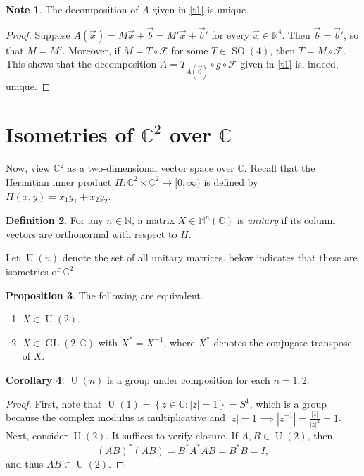 \documentclass[10pt,letterpaper,cm]{nupset}
\theoremstyle{definition}
\newtheorem{definition}{Definition}[section]
\newtheorem{note}[definition]{Note}
\theoremstyle{theorem}
\newtheorem{cor}[definition]{Corollary}
\newtheorem{prop}[definition]{Proposition}
\theoremstyle{remark}
\newcommand{\C}{\mathbb C}
\newcommand{\F}{\mathcal F}
\newcommand{\M}{\mathbb M}
\newcommand{\N}{\mathbb N}
\newcommand{\R}{\mathbb R}
\newcommand{\1}{\mathbf{1}}
\renewcommand{\b}{\vec b}
\newcommand{\x}{\vec x}
\newcommand{\0}{\vec {0}}
\DeclareMathOperator{\SO}{SO}
\DeclareMathOperator{\GL}{GL}
\DeclareMathOperator{\U}{U}
\begin{document}
\begin{note}\label{unique}
The  decomposition of $A$ given in \cref{t1} is unique. 
\end{note}

\begin{proof}
Suppose $A(\x)=M\x +\b =M'\x+\b'$ for every $\x\in \R^4$. Then $\b =\b'$, so that $M=M'$.  Moreover, if $M=T\circ \F$ for some $T\in \SO(4)$, then $T=M\circ \F$. This shows that the decomposition $A=T_{A(\0)}\circ g\circ \F$ given in \cref{t1}  is, indeed,  unique.
\end{proof}

\section{Isometries of $\C^2$ over $\C$}

Now, view $\C^2$ as a two-dimensional vector space over $\C$. Recall that the Hermitian inner product $H:\C^2 \times \C^2 \to [0,\infty)$ is defined by $H(x,y)=x_1\bar{y}_1+x_2\bar{y}_2$.

\begin{definition}
For any $n\in \N$, a matrix $X\in \M^n(\C)$ is \textit{unitary} if its column vectors are orthonormal with respect to $H$.  
\end{definition}


Let $\U(n)$ denote the set of all unitary matrices.  below indicates that these are isometries of $\C^2$.


\begin{prop}
The following are equivalent.
\begin{enumerate}[label=(\alph*)]  
\item $X \in \U(2)$. 
\item $X\in \GL(2, \C)$ with $X^\ast =X^{-1}$, where $X^\ast$ denotes the conjugate transpose of $X$.
\end{enumerate}
\end{prop}

\begin{cor} $\U(n)$ is a group under composition for each $n=1,2$. 
\end{cor}

\begin{proof}
First, note that $\U(1)=\left\{z\in \C:|z|=1\right\}=S^1$, which is a group because the complex modulus is multiplicative and $|z|=1\implies \left\lvert{z^{-1}}\right\rvert=\frac{\left\lvert{\bar{z}}\right\rvert}{\left\lvert{z}\right\rvert^2}=1$. Next, consider $\U(2)$. It suffices to verify closure. If $A,B\in \U(2)$, then $$\left(AB\right)^\ast(AB)=B^\ast A^\ast AB=B^\ast B=I,$$ and thus  $AB\in \U(2)$.
\end{proof}
\end{document}

